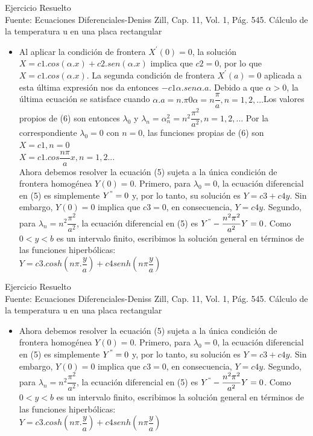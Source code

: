 \documentclass[11pt]{beamer}
\begin{document}
\begin{frame}{Ejercicio Resuelto\\
}{Fuente: Ecuaciones Diferenciales-Deniss Zill, Cap. 11, Vol. 1, Pág. 545.
Cálculo de la temperatura u en una placa rectangular}


  \begin{itemize}
  \item
    Al aplicar la condición de frontera $X^{'}(0)=0$, la solución $X=c1.cos(\alpha.x)+c2.sen(\alpha.x)$
implica que $c2=0$, por lo que $X=c1.cos(\alpha.x)$. La segunda condición de frontera $X^{'}(a)=0$ aplicada a esta última expresión nos da entonces $-c1\alpha.sen\alpha.a$. Debido a que
$\alpha>0$, la última ecuación se satisface cuando $\alpha.a=n.\pi 0 \alpha=n\dfrac{\pi}{a}, n=1,2,...$Los
valores propios de (6) son entonces $\lambda_{0}$ y $\lambda_{n}=\alpha^{2}_{n}=n^{2}\dfrac{\pi^{2}}{a^{2}}, n=1,2,...$ Por la correspondiente
$\lambda_{0}=0$ con $n=0$, las funciones propias de (6) son\\
$X=c1, n=0$\\
$X=c1.cos\dfrac{n\pi}{a}x, n=1,2...$\\
Ahora debemos resolver la ecuación (5) sujeta a la única condición de frontera homogénea
$Y(0)=0$. Primero, para $\lambda_{0}=0$, la ecuación diferencial en (5) es simplemente
$Y^{"}=0$ y, por lo tanto, su solución es $Y=c3+c4y$. Sin embargo, $Y(0)=0$ implica que $c3=0$, en consecuencia, $Y=c4y$. Segundo, para $\lambda_{n}=n^{2}\dfrac{\pi^{2}}{a^{2}}$, la ecuación diferencial en (5) es $Y^{"}-\dfrac{n^{2}\pi^{2}}{a^{2}}Y=0$. Como $0 < y < b$ es un intervalo finito, escribimos la solución general en términos de las funciones hiperbólicas:\\
$Y=c3.cosh(n\pi.\dfrac{y}{a})+c4senh(n\pi\dfrac{y}{a})$\\
    
  \end{itemize}
\end{frame}



\begin{frame}{Ejercicio Resuelto\\
}{Fuente: Ecuaciones Diferenciales-Deniss Zill, Cap. 11, Vol. 1, Pág. 545.
Cálculo de la temperatura u en una placa rectangular}


  \begin{itemize}
  \item
   Ahora debemos resolver la ecuación (5) sujeta a la única condición de frontera homogénea
$Y(0)=0$. Primero, para $\lambda_{0}=0$, la ecuación diferencial en (5) es simplemente
$Y^{"}=0$ y, por lo tanto, su solución es $Y=c3+c4y$. Sin embargo, $Y(0)=0$ implica que $c3=0$, en consecuencia, $Y=c4y$. Segundo, para $\lambda_{n}=n^{2}\dfrac{\pi^{2}}{a^{2}}$, la ecuación diferencial en (5) es $Y^{"}-\dfrac{n^{2}\pi^{2}}{a^{2}}Y=0$. Como $0 < y < b$ es un intervalo finito, escribimos la solución general en términos de las funciones hiperbólicas:\\
$Y=c3.cosh(n\pi.\dfrac{y}{a})+c4senh(n\pi\dfrac{y}{a})$\\
    
  \end{itemize}
\end{frame}
\end{document}

